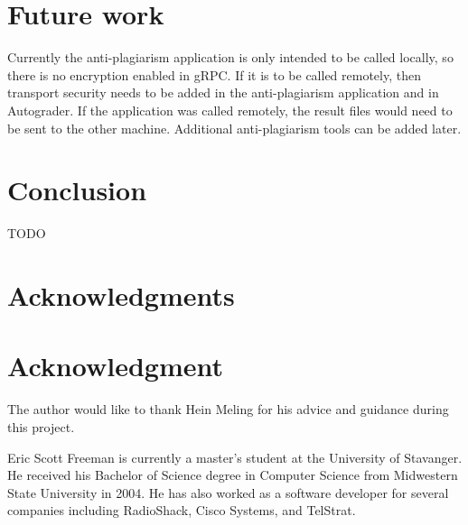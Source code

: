 \documentclass[10pt,journal,compsoc]{IEEEtran}
\begin{document}
	\section{Future work}
	Currently the anti-plagiarism application is only intended to be called locally, so there is no encryption enabled in gRPC. If it is to be called remotely, then transport security needs to be added in the anti-plagiarism application and in Autograder. If the application was called remotely, the result files would need to be sent to the other machine. Additional anti-plagiarism tools can be added later.
	
	\section{Conclusion}
	TODO
	
	\ifCLASSOPTIONcompsoc
		\section*{Acknowledgments}
	\else
		\section*{Acknowledgment}
	\fi
	
	The author would like to thank Hein Meling for his advice and guidance during this project.
	
	
	

\begin{IEEEbiographynophoto}{Eric Scott Freeman}
is currently a master's student at the University of Stavanger. He received his Bachelor of Science degree in Computer Science from Midwestern State University in 2004. He has also worked as a software developer for several companies including RadioShack, Cisco Systems, and TelStrat.
\end{IEEEbiographynophoto}
\end{document}
